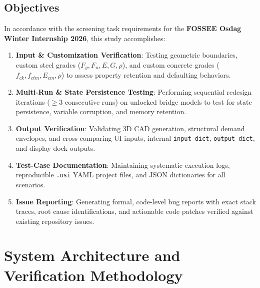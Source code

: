 \documentclass[11pt,a4paper]{article}
\begin{document}
\subsection{Objectives}
In accordance with the screening task requirements for the \textbf{FOSSEE Osdag Winter Internship 2026}, this study accomplishes:
\begin{enumerate}
    \item \textbf{Input \& Customization Verification}: Testing geometric boundaries, custom steel grades ($F_y, F_u, E, G, \rho$), and custom concrete grades ($f_{ck}, f_{ctm}, E_{cm}, \rho$) to assess property retention and defaulting behaviors.
    \item \textbf{Multi-Run \& State Persistence Testing}: Performing sequential redesign iterations ($\ge 3$ consecutive runs) on unlocked bridge models to test for state persistence, variable corruption, and memory retention.
    \item \textbf{Output Verification}: Validating 3D CAD generation, structural demand envelopes, and cross-comparing UI inputs, internal \texttt{input\_dict}, \texttt{output\_dict}, and display dock outputs.
    \item \textbf{Test-Case Documentation}: Maintaining systematic execution logs, reproducible \texttt{.osi} YAML project files, and JSON dictionaries for all scenarios.
    \item \textbf{Issue Reporting}: Generating formal, code-level bug reports with exact stack traces, root cause identifications, and actionable code patches verified against existing repository issues.
\end{enumerate}

\section{System Architecture and Verification Methodology}
\end{document}
